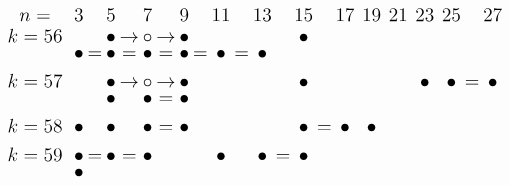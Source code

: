 \documentclass{article}
\begin{document}
\(
\begin{tikzcd}[
nodes={font=\Large,inner sep=0pt},
row sep=0.2cm,
column sep=0.1cm
]
n= && & 3 & & 5 & & 7 & & 9 & & 11 & & 13 & & 15 & & 17 && 19 && 21 && 23 && 25 && 27 && \\
k=56 &&& && \bullet &\rightarrow& \circ &\rightarrow& \bullet && && && \bullet & \\
&&& \bullet &=& \bullet &=& \bullet &=& \bullet &=& \bullet &=& \bullet \\ \\
k=57 &&& && \bullet &\rightarrow& \circ &\rightarrow& \bullet && && && \bullet && && && && \bullet && \bullet &=& \bullet \\
&&& && \bullet && \bullet &=& \bullet \\ \\
k=58 &&& \bullet && \bullet && \bullet &=& \bullet && && && \bullet &=& \bullet && \bullet \\ \\
k=59 &&& \bullet &=& \bullet &=& \bullet && && \bullet && \bullet &=& \bullet \\
&&& \bullet \\ \\
\\
\end{tikzcd}
\)
\end{document}
